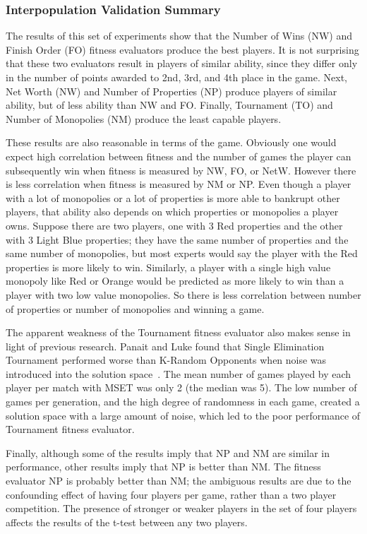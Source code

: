 \subsubsection{Interpopulation Validation Summary}

The results of this set of experiments show that the Number of Wins (NW) and
Finish Order (FO) fitness evaluators produce the best players. It is not
surprising that these two evaluators result in players of similar ability,
since they differ only in the number of points awarded to 2nd, 3rd, and 4th
place in the game. Next, Net Worth (NW) and Number of Properties (NP) produce players
of similar ability, but of less ability than NW and FO. Finally, Tournament (TO)
and Number of Monopolies (NM) produce the least capable players.

These results are also reasonable in terms of the game. Obviously one would
expect high correlation between fitness and the number of games the player can
subsequently win when fitness is measured by NW, FO, or NetW. However there is
less correlation when fitness is measured by NM or NP. Even though a player with
a lot of monopolies or a lot of properties is more able to bankrupt other
players, that ability also depends on which properties or monopolies a player
owns. Suppose there are two players, one with 3 Red properties and the other
with 3 Light Blue properties; they have the same number of properties and the
same number of monopolies, but most experts would say the player with the Red
properties is more likely to win. Similarly, a player with a single high value
monopoly like Red or Orange would be predicted as more likely to win than a
player with two low value monopolies. So there is less correlation between
number of properties or number of monopolies and winning a game.

The apparent weakness of the Tournament fitness evaluator also makes sense in
light of previous research. Panait and Luke found that Single Elimination
Tournament performed worse than K-Random Opponents when noise was introduced
into the solution space~\cite{Panait02acomparative}. The mean number of games
played by each player per match with MSET was only 2 (the median was 5). The low
number of games per generation, and the high degree of randomness in each game,
created a solution space with a large amount of noise, which led to the poor
performance of Tournament fitness evaluator.

Finally, although some of the results imply that NP and NM are similar in
performance, other results imply that NP is better than NM. The fitness
evaluator NP is probably better than NM; the ambiguous results are due to the
confounding effect of having four players per game, rather than a two player
competition. The presence of stronger or weaker players in the set of four
players affects the results of the t-test between any two players.


